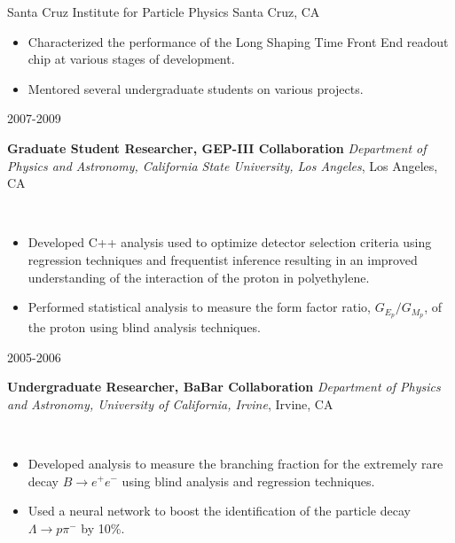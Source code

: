\documentclass[11pt]{article}
\newcommand{\experienceentry}[5] { 
    \noindent
    \begin{minipage}[t]{0.15\textwidth} \begin{flushright} #1 \end{flushright} \end{minipage} \hspace{0.01\textwidth}
    \begin{minipage}[t]{0.84\textwidth} 
        \textbf{#2} \newline
        \emph{#3}, #4 
    \end{minipage} \\[0.01pt]
    #5 \vspace{11pt}
}
\begin{document}
                        {Santa Cruz Institute for Particle Physics}
                        {Santa Cruz, CA}
                        {
                            \begin{itemize}[label=\textcolor{indigodye}{$\circ$}, noitemsep, nolistsep, leftmargin=0.19\textwidth]
                                \item Characterized the performance of the Long Shaping Time Front End readout chip at
                                      various stages of development.
                                \item Mentored several undergraduate students on various projects.
                            \end{itemize}
                        } 
        \experienceentry{2007-2009}
                        {Graduate Student Researcher, GEP-III Collaboration}
                        {Department of Physics and Astronomy, California State University, Los Angeles}
                        {Los Angeles, CA}
                        {
                            \begin{itemize}[label=\textcolor{indigodye}{$\circ$}, noitemsep, nolistsep, leftmargin=0.19\textwidth]
                                \item Developed C++ analysis used to optimize detector selection criteria using regression
                                      techniques and frequentist inference resulting in an improved understanding of the
                                      interaction of the proton in polyethylene.
                                \item Performed statistical analysis to measure the form factor ratio, $G_{E_p}/G_{M_p}$, of
                                      the proton using blind analysis techniques.
                            \end{itemize}
                        }  
        \experienceentry{2005-2006}
                        {Undergraduate Researcher, BaBar Collaboration}
                        {Department of Physics and Astronomy, University of California, Irvine}
                        {Irvine, CA}
                        { 
                            \begin{itemize}[label=\textcolor{indigodye}{$\circ$}, noitemsep, nolistsep, leftmargin=0.19\textwidth]
                                \item Developed analysis to measure the branching fraction for the extremely rare decay 
                                      $B\rightarrow e^+e^-$ using blind analysis and regression techniques.
                                \item Used a neural network to boost the identification of the particle decay 
                                      $\Lambda \rightarrow p \pi^-$ by 10\%.
                            \end{itemize}
                       } 
\end{document}
